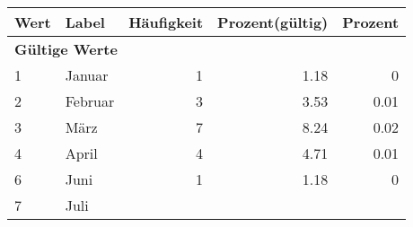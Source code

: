      \begin{longtable}{lXrrr}
     \toprule
     \textbf{Wert} & \textbf{Label} & \textbf{Häufigkeit} & \textbf{Prozent(gültig)} & \textbf{Prozent} \\
     \endhead
     \midrule
     \multicolumn{5}{l}{\textbf{Gültige Werte}}\\

     1 &
     \multicolumn{1}{X}{ Januar   } &


       \num{1} &
       \num[round-mode=places,round-precision=2]{1,18} &
         \num[round-mode=places,round-precision=2]{0} \\

     2 &
     \multicolumn{1}{X}{ Februar   } &


       \num{3} &
       \num[round-mode=places,round-precision=2]{3,53} &
         \num[round-mode=places,round-precision=2]{0,01} \\

     3 &
     \multicolumn{1}{X}{ März   } &


       \num{7} &
       \num[round-mode=places,round-precision=2]{8,24} &
         \num[round-mode=places,round-precision=2]{0,02} \\

     4 &
     \multicolumn{1}{X}{ April   } &


       \num{4} &
       \num[round-mode=places,round-precision=2]{4,71} &
         \num[round-mode=places,round-precision=2]{0,01} \\

     6 &
     \multicolumn{1}{X}{ Juni   } &


       \num{1} &
       \num[round-mode=places,round-precision=2]{1,18} &
         \num[round-mode=places,round-precision=2]{0} \\

     7 &
     \multicolumn{1}{X}{ Juli   } &



\end{longtable}
